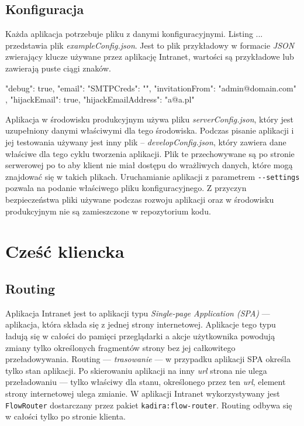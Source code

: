   \subsection{Konfiguracja}
Każda aplikacja potrzebuje pliku z danymi konfiguracyjnymi. Listing ... przedstawia plik \textit{exampleConfig.json}. Jest to plik przykładowy w formacie \textit{JSON} zwierający klucze używane przez aplikację Intranet, wartości są przykładowe lub zawierają puste ciągi znaków.
\begin{js}[caption={{Przykładowa konfiguracja - \textit{exampleConfig.json}}},label={lst:config}]
{
  "debug": true,
  "email": {
    "SMTPCreds": "",
    "invitationFrom": "admin@domain.com"
  },
  "hijackEmail": true,
  "hijackEmailAddress": "a@a.pl"
}
\end{js}
Aplikacja w środowisku produkcyjnym używa pliku \textit{serverConfig.json}, który jest uzupełniony danymi właściwymi dla tego środowiska. Podczas pisanie aplikacji i jej testowania używany jest inny plik -- \textit{developConfig.json}, który zawiera dane właściwe dla tego cyklu tworzenia aplikacji. Plik te przechowywane są po stronie serwerowej po to aby klient nie miał dostępu do wrażliwych danych, które mogą znajdować się w takich plikach. Uruchamianie aplikacji z parametrem \verb|--settings| pozwala na podanie właściwego pliku konfiguracyjnego. Z przyczyn bezpieczeństwa pliki używane podczas rozwoju aplikacji oraz w środowisku produkcyjnym nie są zamieszczone w repozytorium kodu.

\section{Cześć kliencka}
  \subsection{Routing}
Aplikacja Intranet jest to aplikacji typu \textit{Single-page Application (SPA)} --- aplikacja, która składa się z jednej strony internetowej. Aplikacje tego typu ładują się w całości do pamięci przeglądarki a akcje użytkownika powodują zmiany tylko określonych fragmentów strony bez jej całkowitego przeładowywania. Routing --- \textit{trasowanie} --- w przypadku aplikacji SPA określa tylko stan aplikacji. Po skierowaniu aplikacji na inny \textit{url} strona nie ulega przeładowaniu --- tylko właściwy dla stanu, określonego przez ten \textit{url}, element strony internetowej ulega zmianie. W aplikacji Intranet wykorzystywany jest \verb|FlowRouter| dostarczany przez pakiet \verb|kadira:flow-router|. Routing odbywa się w całości tylko po stronie klienta. 


